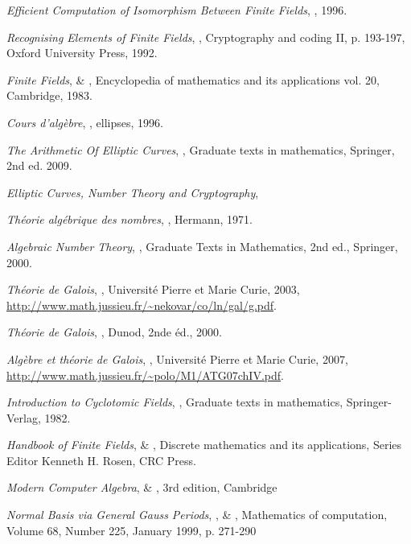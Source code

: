 \documentclass[a4paper]{article} %
\numberwithin{section}{part}
\numberwithin{equation}{section}
\begin{document}
\begin{thebibliography}{LC}

 \emph{Efficient Computation of Isomorphism Between Finite Fields},
, 1996.

 \emph{Recognising Elements of Finite Fields}, , Cryptography and coding II, p. 193-197, Oxford University Press, 1992.

 \emph{Finite Fields},  \& 
, Encyclopedia of mathematics and its applications vol.
20, Cambridge, 1983.

 \emph{Cours d'algèbre}, , ellipses, 1996.

 \emph{The Arithmetic Of Elliptic Curves}, 
, Graduate texts in mathematics, Springer, 2nd ed. 
2009.

 \emph{Elliptic Curves, Number Theory and Cryptography},


 \emph{Théorie algébrique des nombres}, , 
Hermann, 1971.

 \emph{Algebraic Number Theory}, , Graduate Texts
in Mathematics, 2nd ed., Springer, 2000.

 \emph{Théorie de Galois}, , Université 
Pierre et Marie Curie, 2003,  
\url{http://www.math.jussieu.fr/~nekovar/co/ln/gal/g.pdf}.

 \emph{Théorie de Galois}, , Dunod, 2nde
éd., 2000.

 \emph{Algèbre et théorie de Galois}, , 
Université Pierre et Marie Curie, 2007,  
\url{http://www.math.jussieu.fr/~polo/M1/ATG07chIV.pdf}.

 \emph{Introduction to Cyclotomic Fields}, , Graduate texts in mathematics, Springer-Verlag, 1982.


 \emph{Handbook of Finite Fields},  \& 
, Discrete mathematics and its applications, Series Editor 
Kenneth H. Rosen, CRC Press.

 \emph{Modern Computer Algebra},  \&
, 3rd edition, Cambridge

 \emph{Normal Basis \textup{via} General Gauss Periods},
,  \& , 
Mathematics of computation, Volume 68, Number 225, January 1999, p. 271-290


\end{thebibliography}
\end{document}
